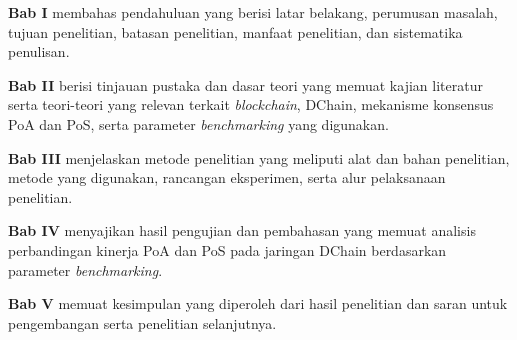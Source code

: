 \textbf{Bab I} membahas pendahuluan yang berisi latar belakang, perumusan masalah, tujuan penelitian, batasan penelitian, manfaat penelitian, dan sistematika penulisan.

\textbf{Bab II} berisi tinjauan pustaka dan dasar teori yang memuat kajian literatur serta teori-teori yang relevan terkait \textit{blockchain}, DChain, mekanisme konsensus PoA dan PoS, serta parameter \textit{benchmarking} yang digunakan.

\textbf{Bab III} menjelaskan metode penelitian yang meliputi alat dan bahan penelitian, metode yang digunakan, rancangan eksperimen, serta alur pelaksanaan penelitian.

\textbf{Bab IV} menyajikan hasil pengujian dan pembahasan yang memuat analisis perbandingan kinerja PoA dan PoS pada jaringan DChain berdasarkan parameter \textit{benchmarking}.

\textbf{Bab V} memuat kesimpulan yang diperoleh dari hasil penelitian dan saran untuk pengembangan serta penelitian selanjutnya.
